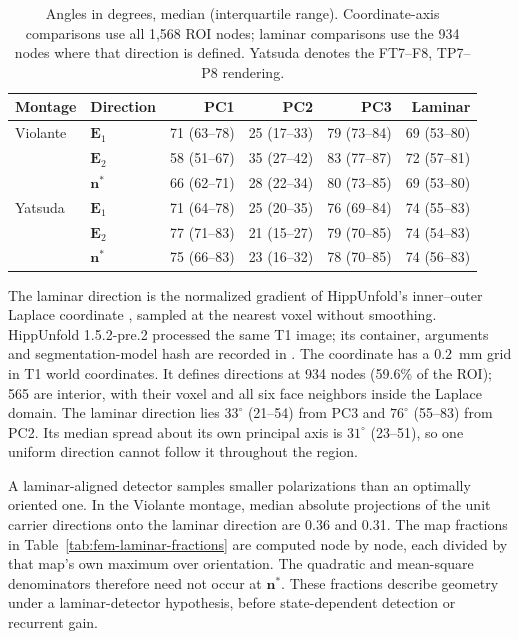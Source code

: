 \documentclass[11pt,a4paper]{article}
\providecommand{\DIFaddtex}[1]{{\protect\color{blue} \sf #1}} %
\providecommand{\DIFadd}[1]{\texorpdfstring{\DIFaddtex{#1}}{#1}} %
\begin{document}
\begin{table}[htbp]
\color{blue}
\centering\small
\setlength{\tabcolsep}{3pt}
\begin{tabular}{@{}llrrrr@{}}
\toprule
Montage & Direction & PC1 & PC2 & PC3 & Laminar\\
\midrule
Violante & $\mathbf E_1$ & 71 (63--78) & 25 (17--33) & 79 (73--84) & 69 (53--80)\\
 & $\mathbf E_2$ & 58 (51--67) & 35 (27--42) & 83 (77--87) & 72 (57--81)\\
 & $\mathbf n^*$ & 66 (62--71) & 28 (22--34) & 80 (73--85) & 69 (53--80)\\
Yatsuda & $\mathbf E_1$ & 71 (64--78) & 25 (20--35) & 76 (69--84) & 74 (55--83)\\
 & $\mathbf E_2$ & 77 (71--83) & 21 (15--27) & 79 (70--85) & 74 (54--83)\\
 & $\mathbf n^*$ & 75 (66--83) & 23 (16--32) & 78 (70--85) & 74 (56--83)\\
\bottomrule
\end{tabular}
\caption{\color{blue}Angles in degrees, median (interquartile range). Coordinate-axis
comparisons use all 1,568 ROI nodes; laminar comparisons use the 934 nodes
where that direction is defined. Yatsuda denotes the FT7--F8, TP7--P8
rendering.}
\label{tab:fem-orientation}
\end{table}

\DIFadd{The laminar direction is the normalized gradient of HippUnfold's inner--outer
Laplace coordinate \cite{dekraker2022}, sampled at the nearest voxel without
smoothing. HippUnfold 1.5.2-pre.2 processed the same T1 image; its container,
arguments and segmentation-model hash are recorded in
}\DIFadd{. The coordinate has a $0.2$~mm grid
in T1 world coordinates. It defines directions at 934 nodes (59.6\% of the
ROI); 565 are interior, with their voxel and all six face neighbors inside
the Laplace domain. The laminar direction lies $33^\circ$ (21--54) from PC3
and $76^\circ$ (55--83) from PC2. Its median spread about its own principal
axis is $31^\circ$ (23--51), so one uniform direction cannot follow it
throughout the region.
}

\DIFadd{A laminar-aligned detector samples smaller polarizations than an optimally
oriented one. In the Violante montage, median absolute projections of the
unit carrier directions onto the laminar direction are 0.36 and 0.31.
The map fractions in Table~\ref{tab:fem-laminar-fractions} are computed
node by node, each divided by that map's own maximum over orientation.
The quadratic and mean-square denominators therefore need not occur at
$\mathbf n^*$. These fractions describe geometry under a laminar-detector
hypothesis, before state-dependent detection or recurrent gain.
}
\end{document}
